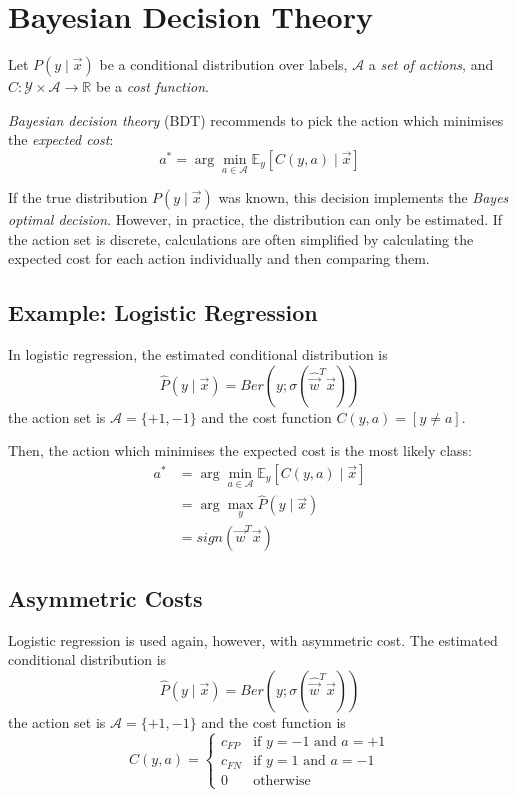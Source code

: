 \section{Bayesian Decision Theory}
Let $P(y \mid \vec{x})$ be a conditional
distribution over labels,
$\mathcal{A}$ a \emph{set of actions},
and $C : \mathcal{Y} \times \mathcal{A} \to \mathbb{R}$
be a \emph{cost function}.

\emph{Bayesian decision theory} (BDT)
recommends to
pick the action which minimises the
\emph{expected cost}:
\begin{equation*}
    a^* =
    \arg\min_{a \in \mathcal{A}}{
        \mathbb{E}_y[C(y, a) \mid \vec{x}]
    }
\end{equation*}

If the true distribution $P(y \mid \vec{x})$
was known, this decision implements the
\emph{Bayes optimal decision}.
However, in practice, the distribution
can only be estimated.
If the action set is discrete,
calculations are often simplified
by calculating the expected cost
for each action individually
and then comparing them.


\subsection{Example: Logistic Regression}
In logistic regression,
the estimated conditional distribution is
\begin{equation*}
    \hat{P}(y \mid \vec{x}) =
    Ber(y ; \sigma(\hat{\vec{w}}^T \vec{x}))
\end{equation*}
the action set is
$\mathcal{A} = \{+1, -1\}$ and
the cost function
$C(y, a) = [y \neq a]$.

Then, the action which minimises the
expected cost is the most likely class:
\begin{align*}
    a^* &=
    \arg\min_{a \in \mathcal{A}}{
        \mathbb{E}_y[C(y, a) \mid \vec{x}]
    } \\
    &= \arg\max_y{\hat{P}(y \mid \vec{x})} \\
    &= sign(\vec{w}^T \vec{x})
\end{align*}


\subsection{Asymmetric Costs}
Logistic regression is used again,
however, with asymmetric cost.
The estimated conditional distribution is
\begin{equation*}
    \hat{P}(y \mid \vec{x}) =
    Ber(y ; \sigma(\hat{\vec{w}}^T \vec{x}))
\end{equation*}
the action set is
$\mathcal{A} = \{+1, -1\}$ and
the cost function is
\begin{equation*}
    C(y, a) =
    \begin{cases}
        c_{FP} & \text{if $y = -1$ and $a = +1$} \\
        c_{FN} & \text{if $y = 1$ and $a = -1$} \\
        0 & \text{otherwise}
    \end{cases}
\end{equation*}

